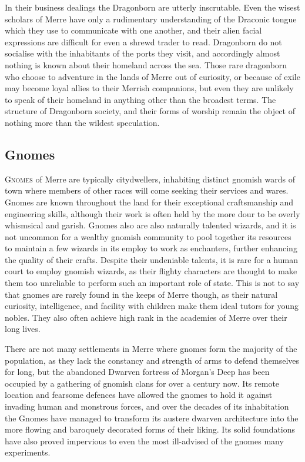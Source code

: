 \documentclass[paper=a4, fontsize=11pt]{scrartcl} %
\begin{document}
\begin{multicols}{2}
In their business dealings the Dragonborn are utterly inscrutable. Even the wisest scholars of Merre have only a rudimentary understanding of the Draconic tongue which they use to communicate with one another, and their alien facial expressions are difficult for even a shrewd trader to read. Dragonborn do not socialise with the inhabitants of the ports they visit, and accordingly almost nothing is known about their homeland across the sea. Those rare dragonborn who choose to adventure in the lands of Merre out of curiosity, or because of exile may become loyal allies to their Merrish companions, but even they are unlikely to speak of their homeland in anything other than the broadest terms. The structure of Dragonborn society, and their forms of worship remain the object of nothing more than the wildest speculation.

\subsection{Gnomes}

\lettrine[lines=2]{\medievalsharp G}{nomes} of Merre are typically citydwellers, inhabiting distinct gnomish wards of town where members of other races will come seeking their services and wares. Gnomes are known throughout the land for their exceptional craftsmanship and engineering skills, although their work is often held by the more dour to be overly whismsical and garish. Gnomes also are also naturally talented wizards, and it is not uncommon for a wealthy gnomish community to pool together its resources to maintain a few wizards in its employ to work as enchanters, further enhancing the quality of their crafts. Despite their undeniable talents, it is rare for a human court to employ gnomish wizards, as their flighty characters are thought to make them too unreliable to perform such an important role of state. This is not to say that gnomes are rarely found in the keeps of Merre though, as their natural curiosity, intelligence, and facility with children make them ideal tutors for young nobles. They also often achieve high rank in the academies of Merre over their long lives.

There are not many settlements in Merre where gnomes form the majority of the population, as they lack the constancy and strength of arms to defend themselves for long, but the abandoned Dwarven fortress of Morgan's Deep has been occupied by a gathering of gnomish clans for over a century now. Its remote location and fearsome defences have allowed the gnomes to hold it against invading human and monstrous forces, and over the decades of its inhabitation the Gnomes have managed to transform its austere dwarven architecture into the more flowing and baroquely decorated forms of their liking. Its solid foundations have also proved impervious to even the most ill-advised of the gnomes many experiments.  


\end{multicols}
\end{document}
